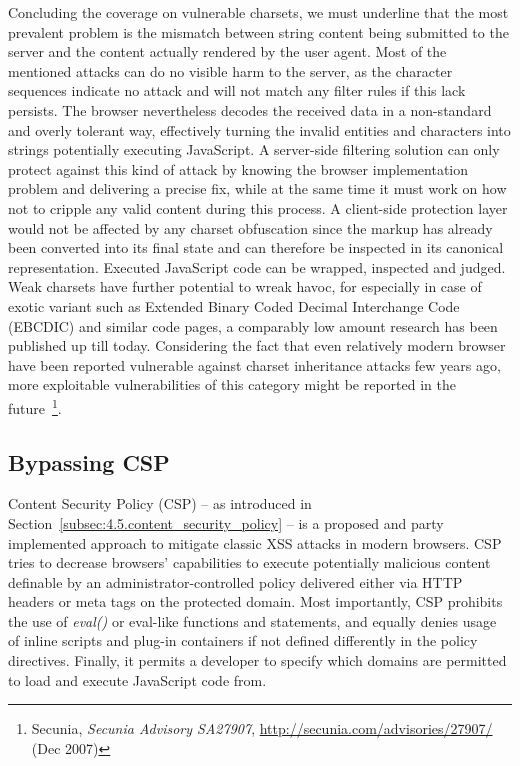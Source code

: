     Concluding the coverage on vulnerable charsets, we must underline that the most prevalent problem is the mismatch between string content being submitted to the server and the content actually rendered by the user agent. Most of the mentioned attacks can do no visible harm to the server, as the character sequences indicate no attack and will not match any filter rules if this lack persists. The browser nevertheless decodes the received data in a non-standard and overly tolerant way, effectively turning the invalid entities and characters into strings potentially executing JavaScript. A server-side filtering solution can only protect against this kind of attack by knowing the browser implementation problem and delivering a precise fix, while at the same time it must work on how not to cripple any valid content during this process. A client-side protection layer would not be affected by any charset obfuscation since the markup has already been converted into its final state and can therefore be inspected in 
its canonical representation. Executed JavaScript code can be wrapped, inspected and judged. Weak charsets have further potential to wreak havoc, for especially in case of exotic variant such as Extended Binary Coded Decimal Interchange Code (EBCDIC) and similar code pages, a comparably low amount research has been published up till today. Considering the fact that even relatively modern browser have been reported vulnerable against charset inheritance attacks few years ago, more exploitable vulnerabilities of this category might be reported in the future~\footnote{Secunia, \textit{Secunia Advisory SA27907}, \url{http://secunia.com/advisories/27907/} (Dec 2007)}. 

    \subsection{Bypassing CSP}
    \label{subsubsec:5.4.12.bypassing_csp}

    Content Security Policy (CSP) -- as introduced in Section~\ref{subsec:4.5.content_security_policy} -- is a proposed and party implemented approach to mitigate classic XSS attacks in modern browsers. CSP tries to decrease browsers' capabilities to execute potentially malicious content definable by an administrator-controlled policy delivered either via HTTP headers or meta tags on the protected domain. Most importantly, CSP prohibits the use of \textit{eval()} or eval-like functions and statements, and equally denies usage of inline scripts and plug-in containers if not defined differently in the policy directives. Finally, it permits a developer to specify which domains are permitted to load and execute JavaScript code from. \\

